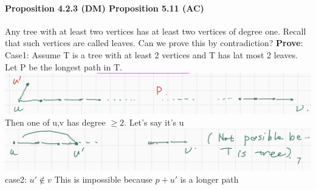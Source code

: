 \documentclass{article}
\begin{document}
\paragraph{Proposition 4.2.3 (DM) Proposition 5.11 (AC)}
Any tree with at least two vertices has at least two vertices of
degree one. Recall that such vertices are called leaves.\newline
Can we prove this by contradiction?\newline
\textbf{Prove}:\newline
Case1:\newline
Assume T is a tree with at least 2 vertices and T has lat most 2 leaves.\newline
Let P be the longest path in T.\newline
\includegraphics{0061}\newline
Then one of u,v has degree $\ge 2$. Let's say it's u\newline
\includegraphics{0062}\newline
case2:\newline
$u'\not\in v$ This is impossible because $p+u'$ is a longer path\newline
\end{document}

